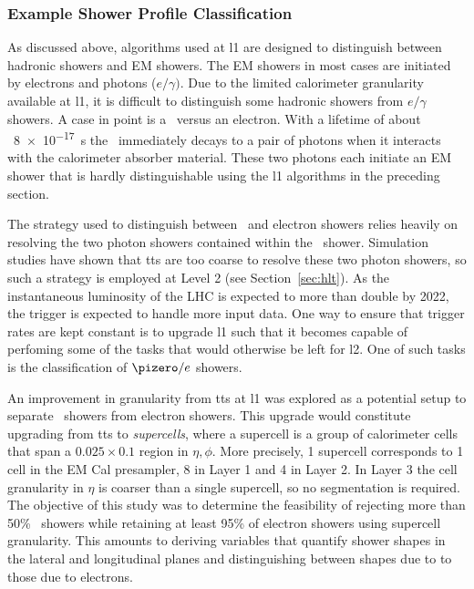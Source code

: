 \subsubsection{Example Shower Profile Classification}
\label{sec:bnl}
\par As discussed above, algorithms used at \acrshort{l1} are designed to 
distinguish between hadronic showers and EM showers. The EM showers in most 
cases are initiated by electrons and photons ($e/\gamma)$.  
Due to the limited calorimeter granularity available at \acrshort{l1}, it is difficult to distinguish 
some hadronic showers from $e/\gamma$ showers. A case in point is a \pizero\  
versus an electron. With a lifetime 
of about ~\SI{8e-17}{\s} the \pizero\ immediately decays to a pair of photons when it 
interacts with the calorimeter absorber material. These two photons each initiate an 
EM shower that is hardly distinguishable using the \acrshort{l1} algorithms in the preceding section. 

\par The strategy used to distinguish between \pizero\ and electron showers relies heavily on 
resolving the two photon showers contained within the \pizero\ shower. Simulation studies 
have shown that \acrshort{tt}s are too coarse to resolve these two photon showers, so such a strategy is 
employed at Level 2 (see Section~\ref{sec:hlt}). As the instantaneous luminosity of the LHC is expected 
to more than double by 2022, the trigger is expected to handle more input data. One way to ensure 
that trigger rates are kept constant is to upgrade \acrshort{l1} such that it becomes capable of perfoming 
some of the tasks that would otherwise be left for \acrshort{l2}. One of such tasks is the 
classification of $\pizero/e$ showers.      

\par An improvement in granularity from \acrshort{tt}s at \acrshort{l1} 
was explored as a potential setup to separate \pizero~showers 
from electron showers. This upgrade would constitute upgrading from \acrshort{tt}s to {\it supercells}, 
where a supercell is a group of calorimeter cells that span a $0.025\times0.1$ region in $\eta,\phi$. 
More precisely, 1 supercell corresponds to 1 cell in the EM Cal presampler, 8 in Layer 1 and 4 in Layer 2. 
In Layer 3 the cell granularity in $\eta$ is coarser than a single supercell, so no segmentation is required. 
The objective of this study was to determine the feasibility of rejecting more than 
50\% \pizero\ showers while retaining at least 95\% of electron showers using supercell granularity. 
This amounts to deriving variables that quantify shower shapes in the lateral and longitudinal 
planes and distinguishing between shapes due to \pizero to those due to electrons.  

